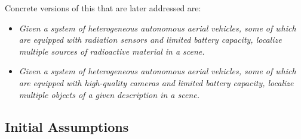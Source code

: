 Concrete versions of this that are later addressed are:
\begin{itemize}
    \item \textit{Given a system of heterogeneous autonomous aerial vehicles, some of which are equipped with radiation sensors and limited battery capacity, localize multiple sources of radioactive material in a scene.}
    \item \textit{Given a system of heterogeneous autonomous aerial vehicles, some of which are equipped with high-quality cameras and limited battery capacity, localize multiple objects of a given description in a scene.}
\end{itemize}
\par


\subsection{Initial Assumptions}

